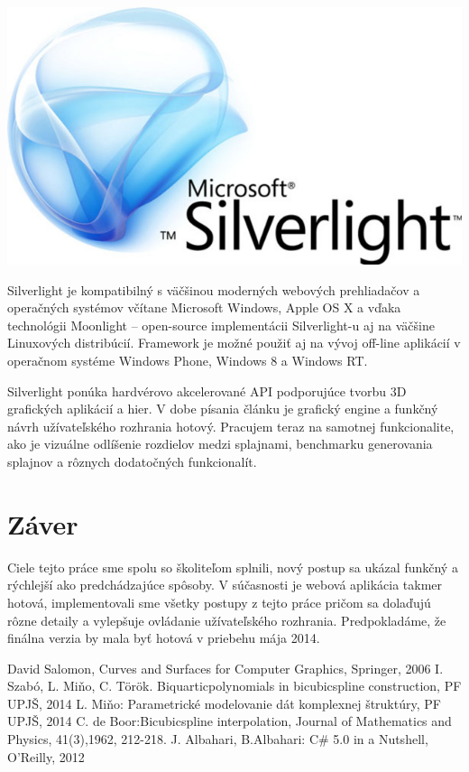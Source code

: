 \documentclass{rnthesis}
\begin{document}
\begin{center}
	\includegraphics[scale=0.2]{silverlight.jpg}
\end{center}

Silverlight je kompatibilný s väčšinou moderných webových prehliadačov a operačných systémov včítane Microsoft Windows, Apple OS X a vďaka technológii Moonlight -- open-source implementácii Silverlight-u aj na väčšine Linuxových distribúcií.
Framework je možné použiť aj na vývoj off-line aplikácií v operačnom systéme Windows Phone, Windows 8 a Windows RT. 



Silverlight ponúka hardvérovo akcelerované API podporujúce tvorbu 3D grafických aplikácií a hier. V dobe písania článku je grafický engine a funkčný návrh užívateľského rozhrania hotový. Pracujem teraz na samotnej funkcionalite, ako je vizuálne odlíšenie rozdielov medzi splajnami, benchmarku generovania splajnov a rôznych dodatočných funkcionalít. 



\section*{Záver}

Ciele tejto práce sme spolu so školiteľom splnili, nový postup sa ukázal funkčný a rýchlejší ako predchádzajúce spôsoby. V súčasnosti je webová aplikácia takmer hotová, implementovali sme všetky postupy z tejto práce pričom sa dolaďujú rôzne detaily a vylepšuje ovládanie užívateľského rozhrania. Predpokladáme, že finálna verzia by mala byť hotová v priebehu mája 2014. 



%

\begin{thebibliography}{9}
  David Salomon, Curves and Surfaces for Computer Graphics, Springer, 2006
  I. Szabó, L. Miňo, C. Török. Biquarticpolynomials in bicubicspline construction, PF UPJŠ, 2014 
  L. Miňo: Parametrické modelovanie dát komplexnej štruktúry, PF UPJŠ, 2014
  C. de Boor:Bicubicspline interpolation, Journal of Mathematics and Physics, 41(3),1962, 212-218.
  J. Albahari, B.Albahari: C\# 5.0 in a Nutshell, O'Reilly, 2012
\end{thebibliography}
%
\end{document}
